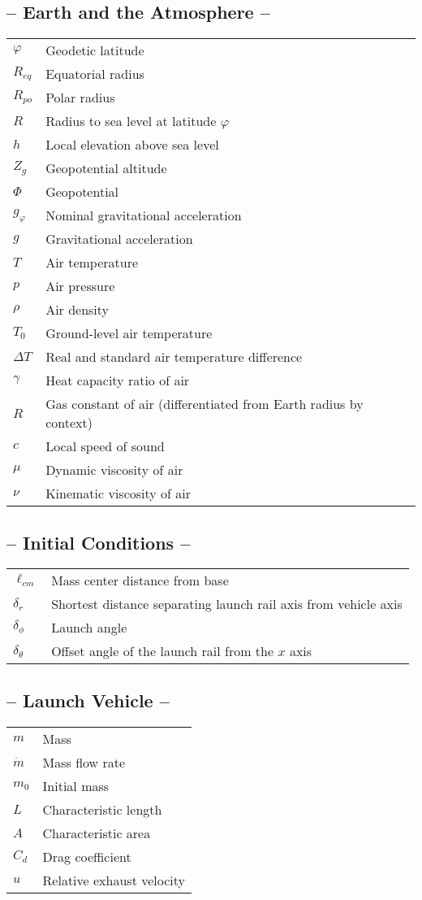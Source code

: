 \documentclass[11pt]{thesis}
\numberwithin{equation}{section}
\begin{document}
\subsection*{-- Earth and the Atmosphere --}
\begin{longtable}[l]{l l}
$\varphi$ & Geodetic latitude \\
$R_{eq}$ & Equatorial radius \\
$R_{po}$ & Polar radius \\
$R$ & Radius to sea level at latitude $\varphi$ \\
$h$ & Local elevation above sea level \\
$Z_g$ & Geopotential altitude \\
$\Phi$ & Geopotential \\
$g_\varphi$ & Nominal gravitational acceleration \\
$g$ & Gravitational acceleration \\
$T$ & Air temperature \\
$p$ & Air pressure \\
$\rho$ & Air density \\
$T_0$ & Ground-level air temperature \\
$\Delta T$ & Real and standard air temperature difference \\
$\gamma$ & Heat capacity ratio of air \\
$R$ & Gas constant of air  (differentiated from Earth radius by context) \\
$c$ & Local speed of sound \\
$\mu$ & Dynamic viscosity of air \\
$\nu$ & Kinematic viscosity of air
\end{longtable}
\subsection*{-- Initial Conditions --}
\begin{longtable}[l]{l l}
$\ell_{cm}$ & Mass center distance from base \\
$\delta_r$ & Shortest distance separating launch rail axis from vehicle axis \\
$\delta_\phi$ & Launch angle \\
$\delta_\theta$ & Offset angle of the launch rail from the $x$ axis
\end{longtable}
\subsection*{-- Launch Vehicle --}
\begin{longtable}[l]{l l}
$m$ & Mass \\
$\dot{m}$ & Mass flow rate \\
$m_0$ & Initial mass \\
$L$ & Characteristic length \\
$A$ & Characteristic area \\
$C_d$ & Drag coefficient \\
$u$ & Relative exhaust velocity \\
\end{longtable}
\end{document}
